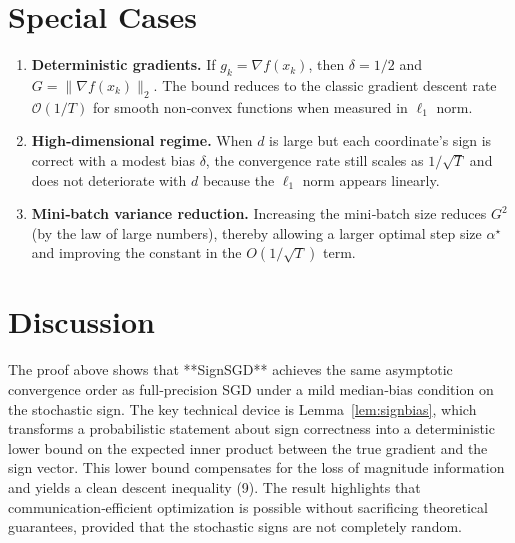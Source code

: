 \documentclass{article}
\begin{document}
\section*{Special Cases}
\begin{enumerate}[label=\arabic*.]
\item \textbf{Deterministic gradients.} If $g_k=\nabla f(x_k)$, then $\delta=1/2$ and $G=\|\nabla f(x_k)\|_2$. The bound reduces to the classic gradient descent rate $\mathcal{O}(1/T)$ for smooth non‑convex functions when measured in $\ell_1$ norm.
\item \textbf{High‑dimensional regime.} When $d$ is large but each coordinate’s sign is correct with a modest bias $\delta$, the convergence rate still scales as $1/\sqrt{T}$ and does not deteriorate with $d$ because the $\ell_1$ norm appears linearly.
\item \textbf{Mini‑batch variance reduction.} Increasing the mini‑batch size reduces $G^2$ (by the law of large numbers), thereby allowing a larger optimal step size $\alpha^\star$ and improving the constant in the $O(1/\sqrt{T})$ term.
\end{enumerate}

\section*{Discussion}
The proof above shows that **SignSGD** achieves the same asymptotic convergence order as full‑precision SGD under a mild median‑bias condition on the stochastic sign. The key technical device is Lemma~\ref{lem:signbias}, which transforms a probabilistic statement about sign correctness into a deterministic lower bound on the expected inner product between the true gradient and the sign vector. This lower bound compensates for the loss of magnitude information and yields a clean descent inequality (9). The result highlights that communication‑efficient optimization is possible without sacrificing theoretical guarantees, provided that the stochastic signs are not completely random.
\end{document}
